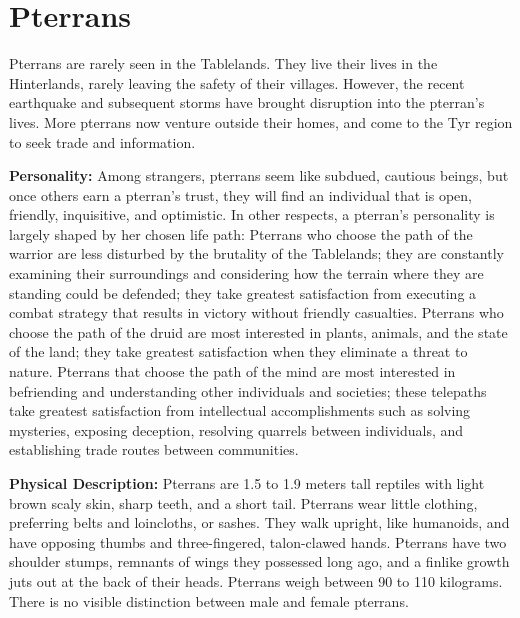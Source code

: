 \section{Pterrans}


Pterrans are rarely seen in the Tablelands. They live their lives in the Hinterlands, rarely leaving the safety of their villages. However, the recent earthquake and subsequent storms have brought disruption into the pterran's lives. More pterrans now venture outside their homes, and come to the Tyr region to seek trade and information.

\textbf{Personality:} Among strangers, pterrans seem like subdued, cautious beings, but once others earn a pterran's trust, they will find an individual that is open, friendly, inquisitive, and optimistic. In other respects, a pterran's personality is largely shaped by her chosen life path: Pterrans who choose the path of the warrior are less disturbed by the brutality of the Tablelands; they are constantly examining their surroundings and considering how the terrain where they are standing could be defended; they take greatest satisfaction from executing a combat strategy that results in victory without friendly casualties. Pterrans who choose the path of the druid are most interested in plants, animals, and the state of the land; they take greatest satisfaction when they eliminate a threat to nature. Pterrans that choose the path of the mind are most interested in befriending and understanding other individuals and societies; these telepaths take greatest satisfaction from intellectual accomplishments such as solving mysteries, exposing deception, resolving quarrels between individuals, and establishing trade routes between communities.

\textbf{Physical Description:} Pterrans are 1.5 to 1.9 meters tall reptiles with light brown scaly skin, sharp teeth, and a short tail. Pterrans wear little clothing, preferring belts and loincloths, or sashes. They walk upright, like humanoids, and have opposing thumbs and three-fingered, talon-clawed hands. Pterrans have two shoulder stumps, remnants of wings they possessed long ago, and a finlike growth juts out at the back of their heads. Pterrans weigh between 90 to 110 kilograms. There is no visible distinction between male and female pterrans.

